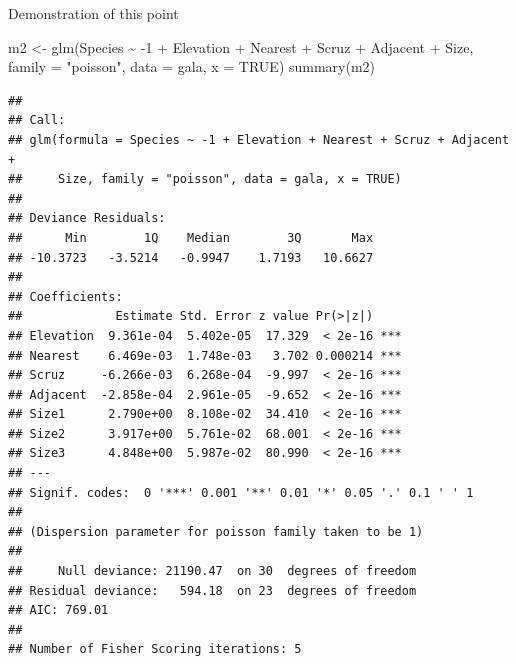 \documentclass[
  ignorenonframetext,
]{beamer}
\newenvironment{Shaded}{\begin{snugshade}}{\end{snugshade}}
\newcommand{\AttributeTok}[1]{\textcolor[rgb]{0.77,0.63,0.00}{#1}}
\newcommand{\ConstantTok}[1]{\textcolor[rgb]{0.00,0.00,0.00}{#1}}
\newcommand{\DecValTok}[1]{\textcolor[rgb]{0.00,0.00,0.81}{#1}}
\newcommand{\FunctionTok}[1]{\textcolor[rgb]{0.00,0.00,0.00}{#1}}
\newcommand{\NormalTok}[1]{#1}
\newcommand{\OtherTok}[1]{\textcolor[rgb]{0.56,0.35,0.01}{#1}}
\newcommand{\SpecialCharTok}[1]{\textcolor[rgb]{0.00,0.00,0.00}{#1}}
\newcommand{\StringTok}[1]{\textcolor[rgb]{0.31,0.60,0.02}{#1}}
\begin{document}
\begin{frame}[fragile]{Demonstration of this point}
\protect\hypertarget{demonstration-of-this-point}{}
\tiny

\begin{Shaded}
\begin{Highlighting}[]
\NormalTok{m2 }\OtherTok{\textless{}{-}}  \FunctionTok{glm}\NormalTok{(Species }\SpecialCharTok{\textasciitilde{}} \SpecialCharTok{{-}}\DecValTok{1} \SpecialCharTok{+}\NormalTok{ Elevation }\SpecialCharTok{+}\NormalTok{ Nearest }\SpecialCharTok{+}\NormalTok{ Scruz }\SpecialCharTok{+}\NormalTok{ Adjacent }\SpecialCharTok{+}\NormalTok{ Size, }
          \AttributeTok{family =} \StringTok{"poisson"}\NormalTok{, }\AttributeTok{data =}\NormalTok{ gala, }\AttributeTok{x =} \ConstantTok{TRUE}\NormalTok{)}
\FunctionTok{summary}\NormalTok{(m2)}
\end{Highlighting}
\end{Shaded}

\begin{verbatim}
## 
## Call:
## glm(formula = Species ~ -1 + Elevation + Nearest + Scruz + Adjacent + 
##     Size, family = "poisson", data = gala, x = TRUE)
## 
## Deviance Residuals: 
##      Min        1Q    Median        3Q       Max  
## -10.3723   -3.5214   -0.9947    1.7193   10.6627  
## 
## Coefficients:
##             Estimate Std. Error z value Pr(>|z|)    
## Elevation  9.361e-04  5.402e-05  17.329  < 2e-16 ***
## Nearest    6.469e-03  1.748e-03   3.702 0.000214 ***
## Scruz     -6.266e-03  6.268e-04  -9.997  < 2e-16 ***
## Adjacent  -2.858e-04  2.961e-05  -9.652  < 2e-16 ***
## Size1      2.790e+00  8.108e-02  34.410  < 2e-16 ***
## Size2      3.917e+00  5.761e-02  68.001  < 2e-16 ***
## Size3      4.848e+00  5.987e-02  80.990  < 2e-16 ***
## ---
## Signif. codes:  0 '***' 0.001 '**' 0.01 '*' 0.05 '.' 0.1 ' ' 1
## 
## (Dispersion parameter for poisson family taken to be 1)
## 
##     Null deviance: 21190.47  on 30  degrees of freedom
## Residual deviance:   594.18  on 23  degrees of freedom
## AIC: 769.01
## 
## Number of Fisher Scoring iterations: 5
\end{verbatim}
\end{frame}
\end{document}
